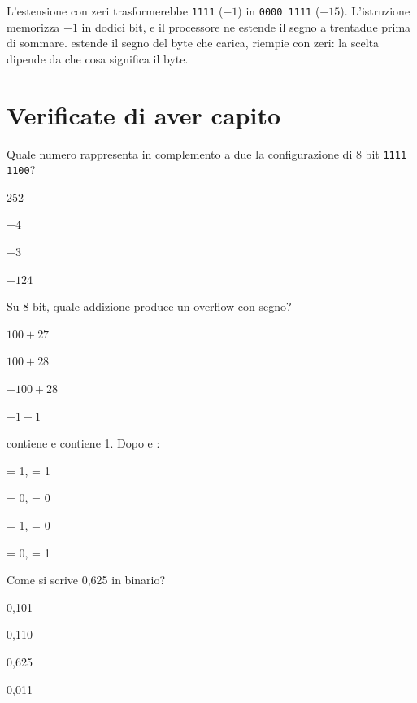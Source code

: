 L'estensione con zeri trasformerebbe \texttt{1111} ($-1$) in
\texttt{0000\,1111} ($+15$). L'istruzione  memorizza $-1$
in dodici bit, e il processore ne estende il segno a trentadue prima di
sommare.  estende il segno del byte che carica,  riempie con
zeri: la scelta dipende da che cosa significa il byte.





\section{Verificate di aver capito}

\begin{quiz}{Quale numero rappresenta in complemento a due la configurazione di 8 bit \texttt{1111 1100}?}
\item 252
\item $-4$
\item $-3$
\item $-124$
\end{quiz}

\begin{quiz}{Su 8 bit, quale addizione produce un overflow con segno?}
\item $100 + 27$
\item $100 + 28$
\item $-100 + 28$
\item $-1 + 1$
\end{quiz}

\begin{quiz}{ contiene  e  contiene 1. Dopo
 e :}
\item {} = 1,  = 1
\item {} = 0,  = 0
\item {} = 1,  = 0
\item {} = 0,  = 1
\end{quiz}

\begin{quiz}{Come si scrive 0,625 in binario?}
\item 0,101
\item 0,110
\item 0,625
\item 0,011
\end{quiz}

